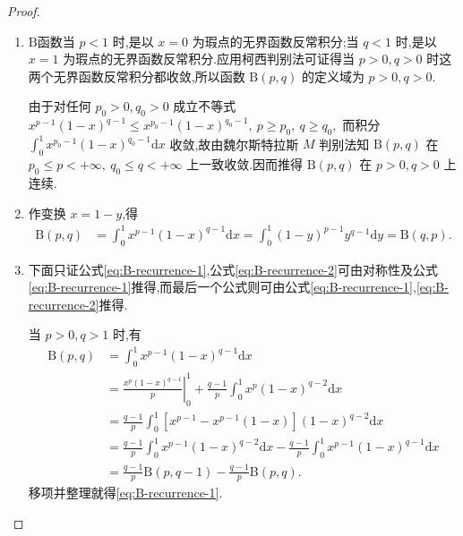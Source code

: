 \documentclass[../../main.tex]{subfiles}%
\begin{document}
\begin{proof}
\begin{enumerate}[(1)]
\item $\mathrm{B}$函数当 $p<1$ 时,是以 $x=0$ 为瑕点的无界函数反常积分;当 $q<1$ 时,是以 $x=1$ 为瑕点的无界函数反常积分.应用柯西判别法可证得当 $p>0,q>0$ 时这两个无界函数反常积分都收敛,所以函数 $\mathrm{B}(p,q)$ 的定义域为 $p>0,q>0$.

由于对任何 $p_0>0,q_0>0$ 成立不等式
$x^{p-1}(1-x)^{q-1} \leqslant x^{p_0-1}(1-x)^{q_0-1},\ p \geqslant p_0,\ q \geqslant q_0,$
而积分 $\int_{0}^{1} x^{p_0-1}(1-x)^{q_0-1}\mathrm{d}x$ 收敛,故由魏尔斯特拉斯 $M$ 判别法知 $\mathrm{B}(p,q)$ 在 $p_0\leqslant p<+\infty,\ q_0\leqslant q<+\infty$ 上一致收敛.因而推得 $\mathrm{B}(p,q)$ 在 $p>0,q>0$ 上连续.

\item 作变换 $x=1-y$,得
\begin{align*}
\mathrm{B}(p,q) &= \int_{0}^{1} x^{p-1}(1-x)^{q-1}\mathrm{d}x = \int_{0}^{1} (1-y)^{p-1}y^{q-1}\mathrm{d}y = \mathrm{B}(q,p).
\end{align*}

\item 下面只证公式\eqref{eq:B-recurrence-1},公式\eqref{eq:B-recurrence-2}可由对称性及公式\eqref{eq:B-recurrence-1}推得,而最后一个公式则可由公式\eqref{eq:B-recurrence-1},\eqref{eq:B-recurrence-2}推得.

当 $p>0,q>1$ 时,有
\begin{align*}
\mathrm{B}(p,q) &= \int_{0}^{1} x^{p-1}(1-x)^{q-1}\mathrm{d}x \\
&= \left.\frac{x^p(1-x)^{q-1}}{p}\right|_{0}^{1} + \frac{q-1}{p}\int_{0}^{1} x^p(1-x)^{q-2}\mathrm{d}x \\
&= \frac{q-1}{p}\int_{0}^{1} \left[x^{p-1} - x^{p-1}(1-x)\right](1-x)^{q-2}\mathrm{d}x \\
&= \frac{q-1}{p}\int_{0}^{1} x^{p-1}(1-x)^{q-2}\mathrm{d}x - \frac{q-1}{p}\int_{0}^{1} x^{p-1}(1-x)^{q-1}\mathrm{d}x \\
&= \frac{q-1}{p}\mathrm{B}(p,q-1) - \frac{q-1}{p}\mathrm{B}(p,q).
\end{align*}
移项并整理就得\eqref{eq:B-recurrence-1}.
\end{enumerate}
\end{proof}
\end{document}
